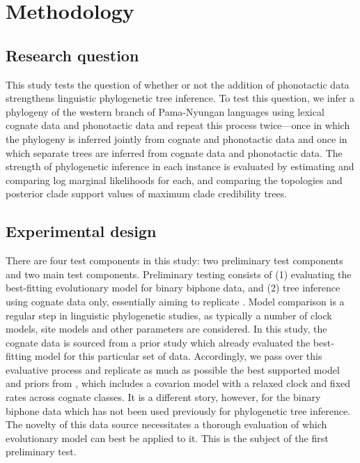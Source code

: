 \documentclass[]{article}
\begin{document}
\hypertarget{pn-tree-methodology}{%
\section{Methodology}\label{pn-tree-methodology}}

\hypertarget{research-question}{%
\subsection{Research question}\label{research-question}}

This study tests the question of whether or not the addition of phonotactic data strengthens linguistic phylogenetic tree inference. To test this question, we infer a phylogeny of the western branch of Pama-Nyungan languages using lexical cognate data and phonotactic data and repeat this process twice---once in which the phylogeny is inferred jointly from cognate and phonotactic data and once in which separate trees are inferred from cognate data and phonotactic data. The strength of phylogenetic inference in each instance is evaluated by estimating and comparing log marginal likelihoods for each, and comparing the topologies and posterior clade support values of maximum clade credibility trees.

\hypertarget{experimental-design}{%
\subsection{Experimental design}\label{experimental-design}}

There are four test components in this study: two preliminary test components and two main test components. Preliminary testing consists of (1) evaluating the best-fitting evolutionary model for binary biphone data, and (2) tree inference using cognate data only, essentially aiming to replicate \textcite{bouckaert_origin_2018}. Model comparison is a regular step in linguistic phylogenetic studies, as typically a number of clock models, site models and other parameters are considered. In this study, the cognate data is sourced from a prior study \autocite{bouckaert_origin_2018} which already evaluated the best-fitting model for this particular set of data. Accordingly, we pass over this evaluative process and replicate as much as possible the best supported model and priors from \textcite{bouckaert_origin_2018}, which includes a covarion model with a relaxed clock and fixed rates across cognate classes. It is a different story, however, for the binary biphone data which has not been used previously for phylogenetic tree inference. The novelty of this data source necessitates a thorough evaluation of which evolutionary model can best be applied to it. This is the subject of the first preliminary test.
\end{document}
